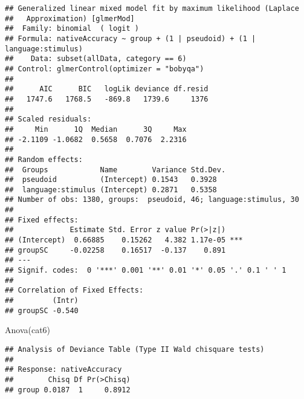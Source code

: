 \documentclass[
]{article}
\newenvironment{Shaded}{\begin{snugshade}}{\end{snugshade}}
\newcommand{\AttributeTok}[1]{\textcolor[rgb]{0.77,0.63,0.00}{#1}}
\newcommand{\DecValTok}[1]{\textcolor[rgb]{0.00,0.00,0.81}{#1}}
\newcommand{\FunctionTok}[1]{\textcolor[rgb]{0.00,0.00,0.00}{#1}}
\newcommand{\NormalTok}[1]{#1}
\newcommand{\OtherTok}[1]{\textcolor[rgb]{0.56,0.35,0.01}{#1}}
\newcommand{\SpecialCharTok}[1]{\textcolor[rgb]{0.00,0.00,0.00}{#1}}
\newcommand{\StringTok}[1]{\textcolor[rgb]{0.31,0.60,0.02}{#1}}
\begin{document}
\begin{verbatim}
## Generalized linear mixed model fit by maximum likelihood (Laplace
##   Approximation) [glmerMod]
##  Family: binomial  ( logit )
## Formula: nativeAccuracy ~ group + (1 | pseudoid) + (1 | language:stimulus)
##    Data: subset(allData, category == 6)
## Control: glmerControl(optimizer = "bobyqa")
## 
##      AIC      BIC   logLik deviance df.resid 
##   1747.6   1768.5   -869.8   1739.6     1376 
## 
## Scaled residuals: 
##     Min      1Q  Median      3Q     Max 
## -2.1109 -1.0682  0.5658  0.7076  2.2316 
## 
## Random effects:
##  Groups            Name        Variance Std.Dev.
##  pseudoid          (Intercept) 0.1543   0.3928  
##  language:stimulus (Intercept) 0.2871   0.5358  
## Number of obs: 1380, groups:  pseudoid, 46; language:stimulus, 30
## 
## Fixed effects:
##             Estimate Std. Error z value Pr(>|z|)    
## (Intercept)  0.66885    0.15262   4.382 1.17e-05 ***
## groupSC     -0.02258    0.16517  -0.137    0.891    
## ---
## Signif. codes:  0 '***' 0.001 '**' 0.01 '*' 0.05 '.' 0.1 ' ' 1
## 
## Correlation of Fixed Effects:
##         (Intr)
## groupSC -0.540
\end{verbatim}

\begin{Shaded}
\begin{Highlighting}[]
\FunctionTok{Anova}\NormalTok{(cat6)}
\end{Highlighting}
\end{Shaded}

\begin{verbatim}
## Analysis of Deviance Table (Type II Wald chisquare tests)
## 
## Response: nativeAccuracy
##        Chisq Df Pr(>Chisq)
## group 0.0187  1     0.8912
\end{verbatim}

\begin{Shaded}
\end{Shaded}
\end{document}
